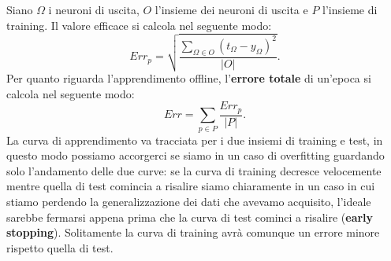 \documentclass[12pt, twoside, letterpaper]{report}
\begin{document}
				Siano $\Omega$ i neuroni di uscita, $O$ l'insieme dei neuroni di uscita e $P$ l'insieme di training. Il valore efficace si calcola nel seguente modo: $$Err_p = \sqrt{\frac{\sum_{\Omega \in O} (t_{\Omega} - y_{\Omega})^2}{|O|}}.$$
				Per quanto riguarda l'apprendimento offline, l'\textbf{errore totale} di un'epoca si calcola nel seguente modo: $$Err = \sum_{p \in P} \frac{Err_p}{|P|}.$$ 
				La curva di apprendimento va tracciata per i due insiemi di training e test, in questo modo possiamo accorgerci se siamo in un caso di overfitting guardando solo l'andamento delle due curve: se la curva di training decresce velocemente mentre quella di test comincia a risalire siamo chiaramente in un caso in cui stiamo perdendo la generalizzazione dei dati che avevamo acquisito, l'ideale sarebbe fermarsi appena prima che la curva di test cominci a risalire (\textbf{early stopping}). Solitamente la curva di training avrà comunque un errore minore rispetto quella di test.
\end{document}
